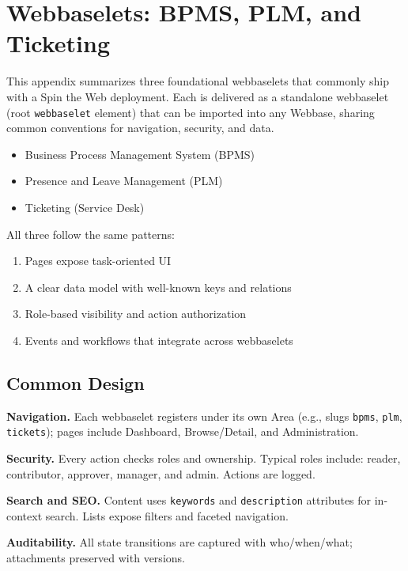 
\chapter{Webbaselets: BPMS, PLM, and Ticketing}
\label{app:webbaselets}

This appendix summarizes three foundational webbaselets that commonly ship with a Spin the Web deployment. Each is delivered as a standalone webbaselet (root \texttt{webbaselet} element) that can be imported into any Webbase, sharing common conventions for navigation, security, and data.

\begin{itemize}
  \item Business Process Management System (BPMS)
  \item Presence and Leave Management (PLM)
  \item Ticketing (Service Desk)
\end{itemize}

All three follow the same patterns:
\begin{enumerate}
  \item Pages expose task-oriented UI
  \item A clear data model with well-known keys and relations
  \item Role-based visibility and action authorization
  \item Events and workflows that integrate across webbaselets
\end{enumerate}

\section{Common Design}
\label{sec:app-webbaselets-common}

\textbf{Navigation.} Each webbaselet registers under its own Area (e.g., slugs \texttt{bpms}, \texttt{plm}, \texttt{tickets}); pages include Dashboard, Browse/Detail, and Administration.

\textbf{Security.} Every action checks roles and ownership. Typical roles include: reader, contributor, approver, manager, and admin. Actions are logged.

\textbf{Search and SEO.} Content uses \texttt{keywords} and \texttt{description} attributes for in-context search. Lists expose filters and faceted navigation.

\textbf{Auditability.} All state transitions are captured with who/when/what; attachments preserved with versions.

